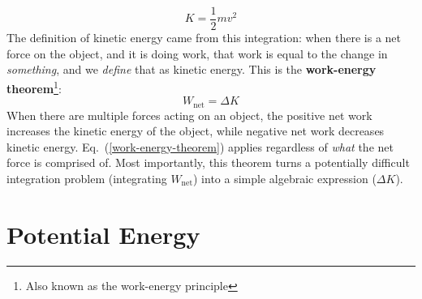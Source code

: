 \documentclass[11pt]{article}
\begin{document}
\begin{equation}
  \boxed{
    K=\frac12mv^2
  }
\end{equation}
The definition of kinetic energy came from this integration: when there is a
net force on the object, and it is doing work, that work is equal to the change
in \emph{something}, and we \emph{define} that as kinetic energy. This is the
\textbf{work-energy theorem}\footnote{Also known as the work-energy principle}:
\begin{equation}
  \boxed{
    W_\text{net}=\Delta K
  }
  \label{work-energy-theorem}
\end{equation}
When there are multiple forces acting on an object, the positive net work
increases the kinetic energy of the object, while negative net work decreases
kinetic energy. Eq.~(\ref{work-energy-theorem}) applies regardless of
\emph{what} the net force is comprised of. Most importantly, this theorem
turns a potentially difficult integration problem (integrating $W_\text{net}$)
into a simple algebraic expression ($\Delta K$).




\section{Potential Energy}
\end{document}
